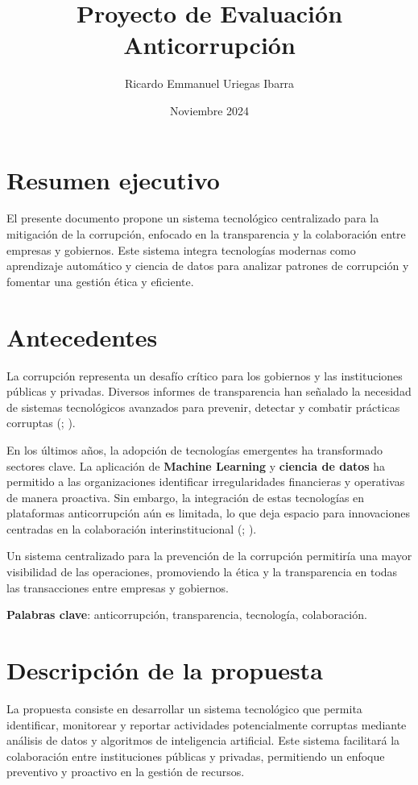 \documentclass[a4paper,12pt]{article}
\title{Proyecto de Evaluación Anticorrupción}
\author{Ricardo Emmanuel Uriegas Ibarra}
\date{Noviembre 2024}
\begin{document}
\maketitle

\section{Resumen ejecutivo}
El presente documento propone un sistema tecnológico centralizado para la mitigación de la corrupción, enfocado en la transparencia y la colaboración entre empresas y gobiernos. Este sistema integra tecnologías modernas como aprendizaje automático y ciencia de datos para analizar patrones de corrupción y fomentar una gestión ética y eficiente.

\section{Antecedentes}
La corrupción representa un desafío crítico para los gobiernos y las instituciones públicas y privadas. Diversos informes de transparencia han señalado la necesidad de sistemas tecnológicos avanzados para prevenir, detectar y combatir prácticas corruptas (\cite{transparency2020}; \cite{ocde2021}).

En los últimos años, la adopción de tecnologías emergentes ha transformado sectores clave. La aplicación de \textbf{Machine Learning} y \textbf{ciencia de datos} ha permitido a las organizaciones identificar irregularidades financieras y operativas de manera proactiva. Sin embargo, la integración de estas tecnologías en plataformas anticorrupción aún es limitada, lo que deja espacio para innovaciones centradas en la colaboración interinstitucional (\cite{morrison2022}; \cite{smith2023}).

Un sistema centralizado para la prevención de la corrupción permitiría una mayor visibilidad de las operaciones, promoviendo la ética y la transparencia en todas las transacciones entre empresas y gobiernos.

\textbf{Palabras clave}: anticorrupción, transparencia, tecnología, colaboración.

\section{Descripción de la propuesta}
La propuesta consiste en desarrollar un sistema tecnológico que permita identificar, monitorear y reportar actividades potencialmente corruptas mediante análisis de datos y algoritmos de inteligencia artificial. Este sistema facilitará la colaboración entre instituciones públicas y privadas, permitiendo un enfoque preventivo y proactivo en la gestión de recursos.
\end{document}
